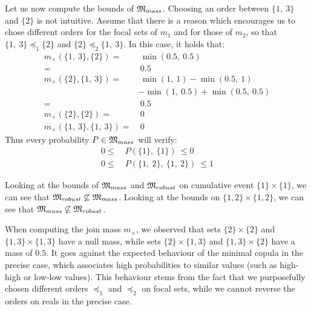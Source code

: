 \begin{example}
    Let us now compute the bounds of $\mathfrak{M}_{mass}$. Choosing an order between $\{1, ~3\}$ and $\{2\}$ is not intuitive. Assume that there is a reason which encourages us to chose different orders for the focal sets of $m_1$ and for those of $m_2$, so that $\{1,~3\} \preceq_1 \{2\}$ and $\{2\} \preceq_2 \{1,~3\}$. In this case, it holds that:
    \begin{align*}
        m_\times(\{1, ~3\}, \{2\}) =& ~\min(0.5, ~0.5)\\
        =& ~0.5\\
        m_\times(\{2\}, \{1, ~3\}) =& ~\min(1, ~1) - \min(0.5, ~1)\\
        & - \min(1, ~0.5) + \min(0.5, ~0.5)\\
        =& ~0.5\\
        m_\times(\{2\}, \{2\}) =& ~0\\
        m_\times(\{1, ~3\}, \{1, ~3\}) =& ~0
    \end{align*}
    Thus every probability $P\in\mathfrak{M}_{mass}$ will verify:
    \begin{align*}
        0 \leqslant ~&P(\{1\},~ \{1\})~ \leqslant 0\\
        0 \leqslant ~&P(\{1, ~2\},~ \{1, ~2\})~ \leqslant 1
    \end{align*}
    
    Looking at the bounds of $\mathfrak{M}_{mass}$ and $\mathfrak{M}_{robust}$ on cumulative event $\{1\}\times\{1\}$, we can see that $\mathfrak{M}_{robust}\not\subseteq \mathfrak{M}_{mass}$. Looking at the bounds on $\{1,2\}\times\{1,2\}$, we can see that $\mathfrak{M}_{mass}\not\subseteq \mathfrak{M}_{robust}$.
    
    \begin{remark}
        When computing the join mass $m_\times$, we observed that sets $\{2\}\times\{2\}$ and $\{1, 3\}\times\{1, 3\}$ have a null mass, while sets $\{2\}\times\{1, 3\}$ and $\{1, 3\}\times\{2\}$ have a mass of $0.5$. It goes against the expected behaviour of the minimal copula in the precise case, which associates high probabilities to similar values (such as high-high or low-low values). This behaviour stems from the fact that we purposefully chosen different orders $\preceq_1$ and $\preceq_2$ on focal sets, while we cannot reverse the orders on reals in the precise case.
        

\end{remark}
\end{example}
